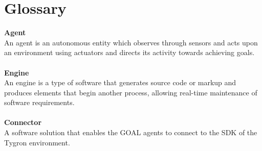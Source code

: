 \section{Glossary}

\textbf{Agent}\\
An agent is an autonomous entity which observes through sensors and acts upon an environment using actuators and directs its activity towards achieving goals.\\
\\
\textbf{Engine}\\
An engine is a type of software that generates source code or markup and produces elements that begin another process, allowing real-time maintenance of software requirements.\\
\\
\textbf{Connector}\\
A software solution that enables the GOAL agents to connect to the SDK of the Tygron environment.
\textbf{}
\textbf{}